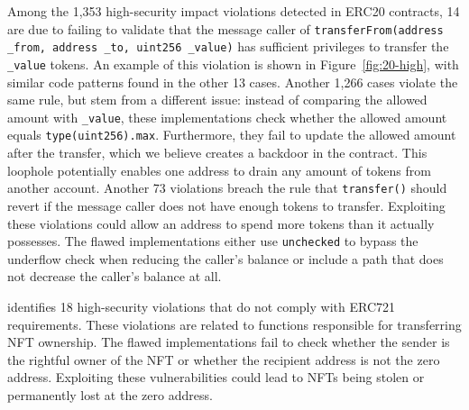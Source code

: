 Among the 1,353 high-security impact violations detected in ERC20 contracts, 
14 are due to failing to validate that the message caller of \texttt{transferFrom(address \_from, address \_to, uint256 \_value)}
has sufficient privileges to transfer the \texttt{\_value} tokens.  
An example of this violation is shown in Figure~\ref{fig:20-high}, 
with similar code patterns found in the other 13 cases.
Another 1,266 cases violate the same rule, but stem from a different issue: 
instead of comparing the allowed amount with \texttt{\_value}, 
these implementations check whether the allowed amount equals \texttt{type(uint256).max}.
Furthermore, they fail to update the allowed amount after the transfer, which we believe 
creates a backdoor in the contract. This loophole potentially enables one address to drain any 
amount of tokens from another account.
Another 73 violations breach the rule that \texttt{transfer()} should revert if the message caller 
does not have enough tokens to transfer. 
Exploiting these violations could allow an address to spend 
more tokens than it actually possesses. 
The flawed implementations either use
\texttt{unchecked} to 
bypass the underflow check when reducing the caller's balance 
or include a path 
that does not decrease the caller's balance at all.

\Tool{} identifies 18 high-security violations that do not comply with ERC721 requirements. 
These violations are related to functions 
responsible for transferring NFT ownership. The 
flawed implementations fail to check whether the sender is the rightful owner of the NFT or whether the recipient 
address is not the zero address. Exploiting these 
vulnerabilities could lead to NFTs being stolen or 
permanently lost at the zero address.



\fi



